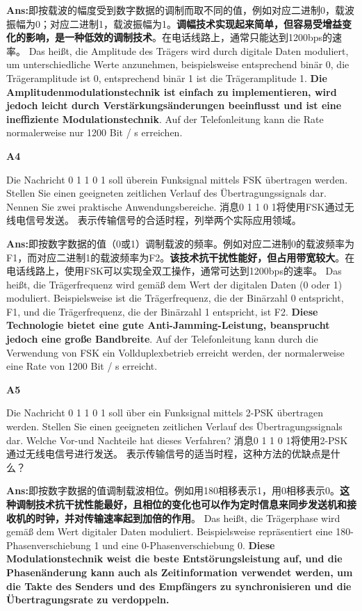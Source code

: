 \documentclass[fleqn]{article}
\begin{document}
\textbf{Ans:}即按载波的幅度受到数字数据的调制而取不同的值，例如对应二进制0，载波振幅为0；对应二进制1，载波振幅为1。{\bfseries 调幅技术实现起来简单，但容易受增益变化的影响，是一种低效的调制技术}。在电话线路上，通常只能达到1200bps的速率。
Das heißt, die Amplitude des Trägers wird durch digitale Daten moduliert, um unterschiedliche Werte anzunehmen, beispielsweise entsprechend binär 0, die Trägeramplitude ist 0, entsprechend binär 1 ist die Trägeramplitude 1. {\bfseries Die Amplitudenmodulationstechnik ist einfach zu implementieren, wird jedoch leicht durch Verstärkungsänderungen beeinflusst und ist eine ineffiziente Modulationstechnik}. Auf der Telefonleitung kann die Rate normalerweise nur 1200 Bit / s erreichen.

\noindent\textbf{A4}

Die Nachricht 0 1 1 0 1 soll überein Funksignal mittels FSK übertragen werden. Stellen Sie einen geeigneten zeitlichen Verlauf des Übertragungssignals dar. Nennen Sie zwei praktische Anwendungsbereiche.
消息0 1 1 0 1将使用FSK通过无线电信号发送。 表示传输信号的合适时程，列举两个实际应用领域。

\textbf{Ans:}即按数字数据的值（0或1）调制载波的频率。例如对应二进制0的载波频率为F1，而对应二进制1的载波频率为F2。{\bfseries 该技术抗干扰性能好，但占用带宽较大}。在电话线路上，使用FSK可以实现全双工操作，通常可达到1200bps的速率。
Das heißt, die Trägerfrequenz wird gemäß dem Wert der digitalen Daten (0 oder 1) moduliert. Beispielsweise ist die Trägerfrequenz, die der Binärzahl 0 entspricht, F1, und die Trägerfrequenz, die der Binärzahl 1 entspricht, ist F2. {\bfseries Diese Technologie bietet eine gute Anti-Jamming-Leistung, beansprucht jedoch eine große Bandbreite}. Auf der Telefonleitung kann durch die Verwendung von FSK ein Vollduplexbetrieb erreicht werden, der normalerweise eine Rate von 1200 Bit / s erreicht.

\noindent\textbf{A5}

Die Nachricht 0 1 1 0 1 soll über ein Funksignal mittels 2-PSK übertragen werden. Stellen Sie einen geeigneten zeitlichen Verlauf des Übertragungssignals dar. Welche Vor-und Nachteile hat dieses Verfahren?
消息0 1 1 0 1将使用2-PSK通过无线电信号进行发送。 表示传输信号的适当时程，这种方法的优缺点是什么？

\textbf{Ans:}即按数字数据的值调制载波相位。例如用180相移表示1，用0相移表示0。{\bfseries 这种调制技术抗干扰性能最好，且相位的变化也可以作为定时信息来同步发送机和接收机的时钟，并对传输速率起到加倍的作用}。
Das heißt, die Trägerphase wird gemäß dem Wert digitaler Daten moduliert. Beispielsweise repräsentiert eine 180-Phasenverschiebung 1 und eine 0-Phasenverschiebung 0. {\bfseries Diese Modulationstechnik weist die beste Entstörungsleistung auf, und die Phasenänderung kann auch als Zeitinformation verwendet werden, um die Takte des Senders und des Empfängers zu synchronisieren und die Übertragungsrate zu verdoppeln.}
\end{document}
